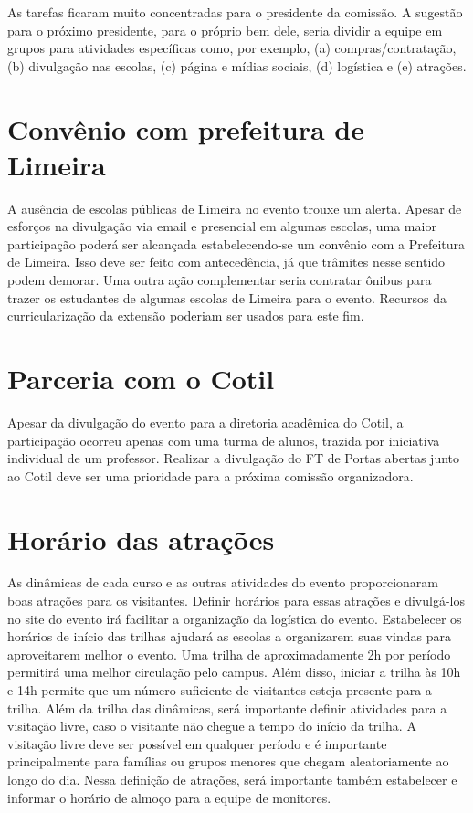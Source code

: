 \documentclass[
  letterpaper,
  DIV=11,
  numbers=noendperiod]{scrreprt}
\begin{document}
As tarefas ficaram muito concentradas para o presidente da comissão. A
sugestão para o próximo presidente, para o próprio bem dele, seria
dividir a equipe em grupos para atividades específicas como, por
exemplo, (a) compras/contratação, (b) divulgação nas escolas, (c) página
e mídias sociais, (d) logística e (e) atrações.

\section{Convênio com prefeitura de
Limeira}\label{convuxeanio-com-prefeitura-de-limeira}

A ausência de escolas públicas de Limeira no evento trouxe um alerta.
Apesar de esforços na divulgação via email e presencial em algumas
escolas, uma maior participação poderá ser alcançada estabelecendo-se um
convênio com a Prefeitura de Limeira. Isso deve ser feito com
antecedência, já que trâmites nesse sentido podem demorar. Uma outra
ação complementar seria contratar ônibus para trazer os estudantes de
algumas escolas de Limeira para o evento. Recursos da curricularização
da extensão poderiam ser usados para este fim.

\section{Parceria com o Cotil}\label{parceria-com-o-cotil}

Apesar da divulgação do evento para a diretoria acadêmica do Cotil, a
participação ocorreu apenas com uma turma de alunos, trazida por
iniciativa individual de um professor. Realizar a divulgação do FT de
Portas abertas junto ao Cotil deve ser uma prioridade para a próxima
comissão organizadora.

\section{Horário das atrações}\label{horuxe1rio-das-atrauxe7uxf5es}

As dinâmicas de cada curso e as outras atividades do evento
proporcionaram boas atrações para os visitantes. Definir horários para
essas atrações e divulgá-los no site do evento irá facilitar a
organização da logística do evento. Estabelecer os horários de início
das trilhas ajudará as escolas a organizarem suas vindas para
aproveitarem melhor o evento. Uma trilha de aproximadamente 2h por
período permitirá uma melhor circulação pelo campus. Além disso, iniciar
a trilha às 10h e 14h permite que um número suficiente de visitantes
esteja presente para a trilha. Além da trilha das dinâmicas, será
importante definir atividades para a visitação livre, caso o visitante
não chegue a tempo do início da trilha. A visitação livre deve ser
possível em qualquer período e é importante principalmente para famílias
ou grupos menores que chegam aleatoriamente ao longo do dia. Nessa
definição de atrações, será importante também estabelecer e informar o
horário de almoço para a equipe de monitores.
\end{document}
